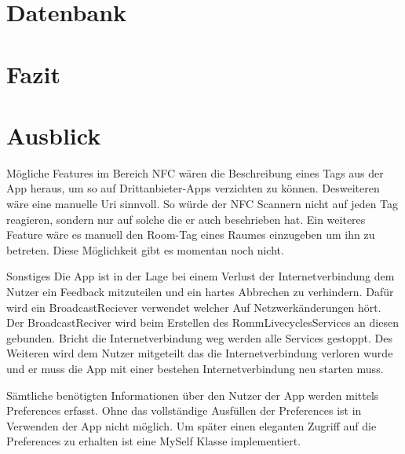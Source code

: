 \section{Datenbank}
\label{sec:Datenbank}
\section{Fazit}
\label{sec:Fazit}

\section{Ausblick}
\label{sec:Ausblick}
Mögliche Features im Bereich NFC wären die Beschreibung eines Tags aus der App heraus, um so auf Drittanbieter-Apps verzichten zu können. Desweiteren wäre eine manuelle Uri sinnvoll. So würde der NFC Scannern nicht auf jeden Tag reagieren, sondern nur auf solche die er auch beschrieben hat. Ein weiteres Feature wäre es manuell den Room-Tag eines Raumes einzugeben um ihn zu betreten. Diese Möglichkeit gibt es momentan noch nicht.

Sonstiges
Die App ist in der Lage bei einem Verlust der Internetverbindung dem Nutzer ein Feedback mitzuteilen und ein hartes Abbrechen zu verhindern. Dafür wird ein BroadcastReciever verwendet welcher Auf Netzwerkänderungen hört. Der BroadcastReciver wird beim Erstellen des RommLivecyclesServices an diesen gebunden. Bricht die Internetverbindung weg werden alle Services gestoppt. Des Weiteren wird dem Nutzer mitgeteilt das die Internetverbindung verloren wurde und er muss die App mit einer bestehen Internetverbindung neu starten muss.

Sämtliche benötigten Informationen über den Nutzer der App werden mittels Preferences erfasst. Ohne das vollständige Ausfüllen der Preferences ist in Verwenden der App nicht möglich. Um später einen eleganten Zugriff auf die Preferences zu erhalten ist eine MySelf Klasse implementiert.

